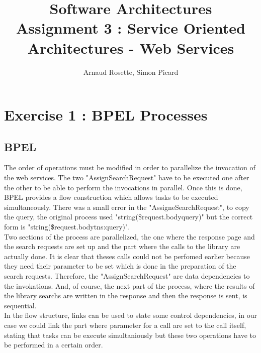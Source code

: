 \documentclass[a4paper,10pt]{article}
\title{Software Architectures\\ Assignment 3 : Service Oriented Architectures - Web Services}
\author{Arnaud Rosette, Simon Picard}
\begin{document}
\maketitle
\section{Exercise 1 : BPEL Processes}
\subsection{BPEL}
The order of operations must be modified in order to parallelize the invocation of the web services. The two "AssignSearchRequest" have to be executed one  after the other to be able to perform the invocations in parallel. Once this is done, BPEL provides a flow construction which allows tasks to be executed simultaneously. There was a small error in the "AssigneSearchRequest", to copy the query, the original process used "string(\$request.body\/\/query)" but the correct form is "string(\$request.body\/\/tns:query)".\\

Two sections of the process are parallelized, the one where the response page and the search requests are set up and the part where the calls to the library are actually done. It is clear that theses calls could not be perfomed earlier because they need their parameter to be set which is done in the preparation of the search requests. Therefore, the "AssignSearchRequest" are data dependencies to the invokations. And, of course, the next part of the process, where the results of the library searchs are written in the response and then the response is sent, is sequential.\\

In the flow structure, links can be used to state some control dependencies, in our case we could link the part where parameter for a call are set to the call itself, stating that tasks can be execute simultaniously but these two operations have to be performed in a certain order.
\end{document}
